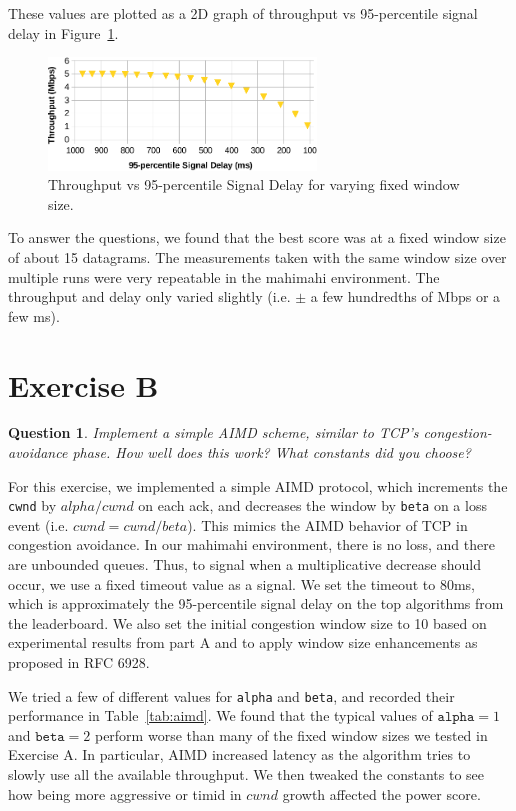 \documentclass[twoside]{article}
\newtheorem{question}[theorem]{Question}
\begin{document}
These values are plotted as a 2D graph of throughput vs 95-percentile signal
delay in Figure~\ref{fig:exa}.

\begin{figure}[h]
  \centering
  \includegraphics[height=3cm]{./img/exa_fig.pdf}
  \caption{Throughput vs 95-percentile Signal Delay for varying fixed window size.}
  \label{fig:exa}
\end{figure}

To answer the questions, we found that the best score was at a fixed window
size of about 15 datagrams. The measurements taken with the same window size
over multiple runs were very repeatable in the mahimahi environment. The
throughput and delay only varied slightly (i.e. $\pm$ a few hundredths of Mbps
or a few ms).

\vfill
\pagebreak

\section*{Exercise B}
\begin{question}
  Implement a simple AIMD scheme, similar to TCP's congestion-avoidance phase.
  How well does this work? What constants did you choose?
\end{question}

For this exercise, we implemented a simple AIMD protocol, which increments the
\texttt{cwnd} by $alpha/cwnd$ on each ack, and decreases the window by
\texttt{beta} on a loss event (i.e. $cwnd = cwnd / beta$).
This mimics the AIMD behavior of TCP in congestion avoidance.
In our mahimahi environment, there is no loss, and there are unbounded queues.
Thus, to signal when a multiplicative decrease should occur, we use a fixed
timeout value as a signal. We set the timeout to 80ms, which is approximately
the 95-percentile signal delay on the top algorithms from the leaderboard.
We also set the initial congestion window size to 10 based on experimental
results from part A and to apply window size enhancements as proposed in RFC
6928.

We tried a few of different values for \texttt{alpha} and \texttt{beta},
and recorded their performance in Table~\ref{tab:aimd}.
We found that the typical values of $\texttt{alpha} = 1$ and $\texttt{beta} = 2$
perform worse than many of the fixed window sizes we tested in Exercise A.
In particular, AIMD increased latency as the algorithm tries to slowly use
all the available throughput. We then tweaked the constants to see how being
more aggressive or timid in $cwnd$ growth affected the power score.
\end{document}
